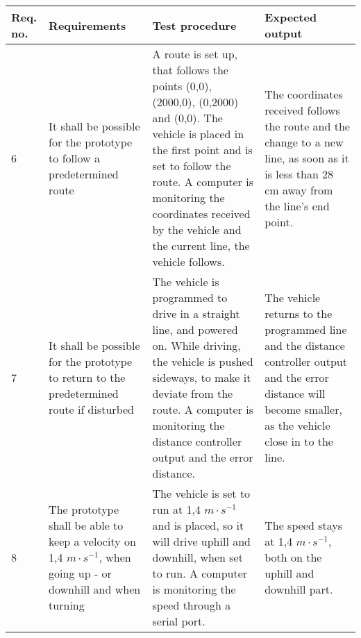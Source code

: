 \begin{table}[H] \centering
\begin{tabular}{|p{1cm}|p{4cm}|p{7cm}|p{3cm}|}
\hline%
\textbf{Req. no.}  &  \textbf{Requirements} &  \textbf{Test procedure}  &  \textbf{Expected output}        \\
\hline
           6    &   It shall be possible for the prototype to follow a predetermined route &   A route is set up, that follows the points (0,0), (2000,0), (0,2000) and (0,0). The vehicle is placed in the first point and is set to follow the route. A computer is monitoring the coordinates received by the vehicle and the current line, the vehicle follows.  &  The coordinates received follows the route and the change to a new line, as soon as it is less than 28 cm away from the line's end point. \\
\hline%
           7    &   It shall be possible for the prototype to return to the predetermined route if disturbed   &  The vehicle is programmed to drive in a straight line, and powered on. While driving, the vehicle is pushed sideways, to make it deviate from the route. A computer is monitoring the distance controller output and the error distance.    &   The vehicle returns to the programmed line and the distance controller output and the error distance will become smaller, as the vehicle close in to the line.            \\ 
\hline%
           8    &   The prototype shall be able to keep a velocity on 1,4 $m \cdot s^{-1}$, when going up - or downhill and when turning   &  The vehicle is set to run at 1,4 $m \cdot s^{-1}$ and is placed, so it will drive uphill and downhill, when set to run. A computer is monitoring the speed through a serial port.   &    The speed stays at 1,4 $m \cdot s^{-1}$, both on the uphill and downhill part.            \\
\hline%
\end{tabular}
\label{tab:AcceptTestTestProcedure}
\end{table}

